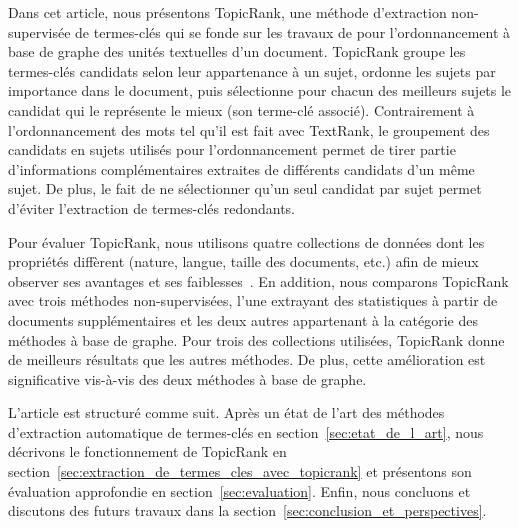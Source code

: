   Dans cet article, nous présentons TopicRank, une méthode d'extraction
  non-supervisée de termes-clés qui se fonde sur les travaux de
   pour l'ordonnancement à base de
  graphe des unités textuelles d'un document. TopicRank groupe les termes-clés
  candidats selon leur appartenance à un sujet, ordonne les sujets par
  importance dans le document, puis sélectionne pour chacun des meilleurs sujets
  le candidat qui le représente le mieux (son terme-clé associé).
  Contrairement à l'ordonnancement des mots tel qu'il est fait avec TextRank,
  le groupement des candidats en sujets utilisés pour l'ordonnancement permet de
  tirer partie d'informations complémentaires extraites de différents candidats
  d'un même sujet. De plus, le fait de ne sélectionner qu'un seul candidat par
  sujet permet d'éviter l'extraction de termes-clés redondants.

  Pour évaluer TopicRank, nous utilisons quatre collections de données dont les
  propriétés diffèrent (nature, langue, taille des documents, etc.) afin de
  mieux observer ses avantages et ses faiblesses~\cite{hassan2010conundrums}. En
  addition, nous comparons TopicRank avec trois méthodes non-supervisées, l'une
  extrayant des statistiques à partir de documents supplémentaires et les deux
  autres appartenant à la catégorie des méthodes à base de graphe. Pour trois
  des collections utilisées, TopicRank donne de meilleurs résultats que les
  autres méthodes. De plus, cette amélioration est significative vis-à-vis des
  deux méthodes à base de graphe.

  L'article est structuré comme suit. Après un état de l'art des méthodes
  d'extraction automatique de termes-clés en
  section~\ref{sec:etat_de_l_art}, nous décrivons le fonctionnement de TopicRank
  en section~\ref{sec:extraction_de_termes_cles_avec_topicrank} et présentons
  son évaluation approfondie en section~\ref{sec:evaluation}. Enfin, nous
  concluons et discutons des futurs travaux dans la
  section~\ref{sec:conclusion_et_perspectives}.

